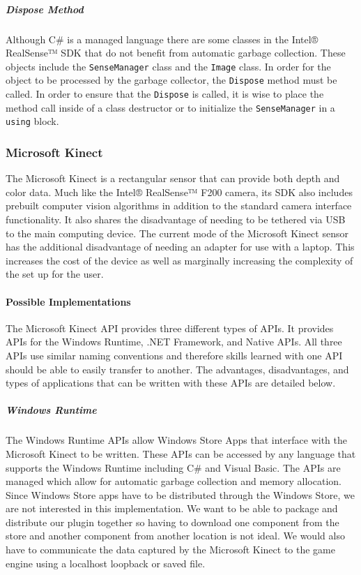 \documentclass[12pt]{article}
\begin{document}
\subparagraph{Dispose Method}\label{dispose-method}

Although C\# is a managed language there are some classes in the Intel®
RealSense™ SDK that do not benefit from automatic garbage collection.
These objects include the \texttt{SenseManager} class and the
\texttt{Image} class. In order for the object to be processed by the
garbage collector, the \texttt{Dispose} method must be called. In order
to ensure that the \texttt{Dispose} is called, it is wise to place the
method call inside of a class destructor or to initialize the
\texttt{SenseManager} in a \texttt{using} block.

\subsubsection{Microsoft Kinect}\label{microsoft-kinect}

The Microsoft Kinect is a rectangular sensor that can provide both depth
and color data. Much like the Intel® RealSense™ F200 camera, its SDK
also includes prebuilt computer vision algorithms in addition to the
standard camera interface functionality. It also shares the disadvantage
of needing to be tethered via USB to the main computing device. The
current mode of the Microsoft Kinect sensor has the additional
disadvantage of needing an adapter for use with a laptop. This increases
the cost of the device as well as marginally increasing the complexity
of the set up for the user.

\paragraph{Possible Implementations}\label{possible-implementations-1}

The Microsoft Kinect API provides three different types of APIs. It
provides APIs for the Windows Runtime, .NET Framework, and Native APIs.
All three APIs use similar naming conventions and therefore skills
learned with one API should be able to easily transfer to another. The
advantages, disadvantages, and types of applications that can be written
with these APIs are detailed below.

\subparagraph{Windows Runtime}\label{windows-runtime}

The Windows Runtime APIs allow Windows Store Apps that interface with
the Microsoft Kinect to be written. These APIs can be accessed by any
language that supports the Windows Runtime including C\# and Visual
Basic. The APIs are managed which allow for automatic garbage collection
and memory allocation. Since Windows Store apps have to be distributed
through the Windows Store, we are not interested in this implementation.
We want to be able to package and distribute our plugin together so
having to download one component from the store and another component
from another location is not ideal. We would also have to communicate
the data captured by the Microsoft Kinect to the game engine using a
localhost loopback or saved file.
\end{document}
